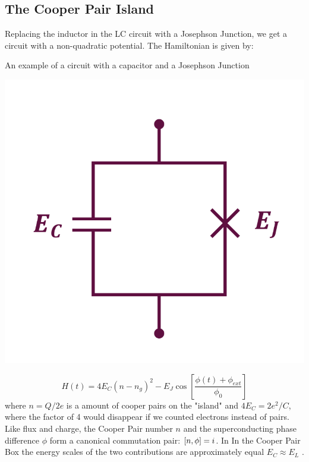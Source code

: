 \subsection{The Cooper Pair Island}
Replacing the inductor in the LC circuit with a Josephson Junction, we get a circuit with a non-quadratic potential. The Hamiltonian is given by:
\begin{marginfigure}
    \caption{An example of a circuit with a capacitor and a Josephson Junction}
    \includegraphics[width = \textwidth]{tex/fig_for_text/CooperPairIsland.png}
    \label{fig:cooper_pair_island}
\end{marginfigure}

\begin{equation}
    H(t) =  4 E_C (n - n_g)^2 -  E_J \cos \left[ \frac{\phi(t) + \phi_{ext}}{\phi_0} \right]
\end{equation}
where $n = Q/2e$ is a amount of cooper pairs on the "island" and $4E_C = 2e^2/C$, where the factor of 4 would disappear if we counted electrons instead of pairs. Like flux and charge, the Cooper Pair number $n$ and the superconducting phase difference $\phi$ form a canonical commutation pair: $\comm{n}{\phi} = i$. In In the Cooper Pair Box the energy scales of the two contributions are approximately equal $E_C \approx E_L$ \cite{blais_circuit_2021}. 



